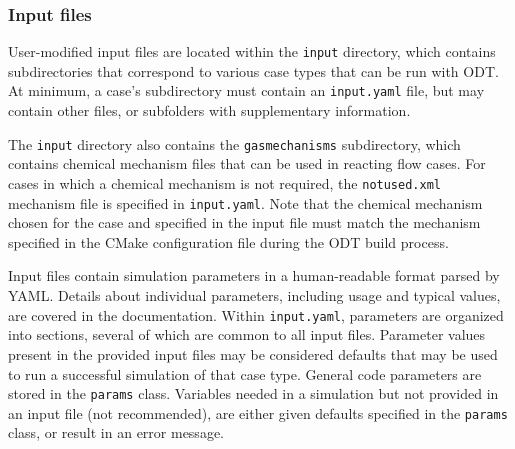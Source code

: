 \documentclass[preprint,12pt, a4paper]{elsarticle}
\begin{document}
\subsubsection{Input files}

User-modified input files are located within the \texttt{input} directory, which contains subdirectories that correspond to various case types that can be run with ODT. At minimum, a case's subdirectory must contain an \texttt{input.yaml} file, but may contain other files, or subfolders with supplementary information. 

The \texttt{input} directory also contains the \texttt{gas\textunderscore mechanisms} subdirectory, which contains chemical mechanism files that can be used in reacting flow cases. For cases in which a chemical mechanism is not required, the \texttt{not\textunderscore used.xml} mechanism file is specified in \texttt{input.yaml}. Note that the chemical mechanism chosen for the case and specified in the input file must match the mechanism specified in the CMake configuration file during the ODT build process. 

Input files contain simulation parameters in a human-readable format parsed by YAML. Details about individual parameters, including usage and typical values, are covered in the documentation. Within \texttt{input.yaml}, parameters are organized into sections, several of which are common to all input files. Parameter values present in the provided input files may be considered defaults that may be used to run a successful simulation of that case type. General code parameters are stored in the \texttt{params} class. Variables needed in a simulation but not provided in an input file (not recommended), are either given defaults specified in the \texttt{params} class, or result in an error message. 

\end{document}
